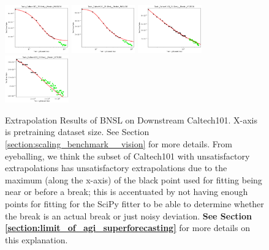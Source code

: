 \documentclass{article} %
\begin{document}
\begin{figure}
\includegraphics[width=0.245\textwidth]{figures/scaling_laws_benchmark_dataset_plots/caltech_25shot___MiX_B_16.png}
\includegraphics[width=0.245\textwidth]{figures/scaling_laws_benchmark_dataset_plots/caltech_25shot___MiX_L_16.png}
\includegraphics[width=0.245\textwidth]{figures/scaling_laws_benchmark_dataset_plots/caltech_25shot___ViT_B_16.png}
\includegraphics[width=0.245\textwidth]{figures/scaling_laws_benchmark_dataset_plots/caltech_25shot___ViT_S_16.png}

    \caption{
    Extrapolation Results of BNSL on Downstream Caltech101. X-axis is pretraining dataset size. See Section \ref{section:scaling_benchmark__vision} for more details. From eyeballing, we think the subset of Caltech101 with unsatisfactory extrapolations has unsatisfactory extrapolations due to the maximum (along the x-axis) of the black point used for fitting being near or before a break; this is accentuated by not having enough points for fitting for the SciPy fitter to be able to determine whether the break is an actual break or just noisy deviation. \textbf{See Section \ref{section:limit_of_agi_superforecasting}} for more details on this explanation.
    }
    \label{fig:scaling_laws_benchmark_dataset__caltech}
\end{figure}

\clearpage
\end{document}
